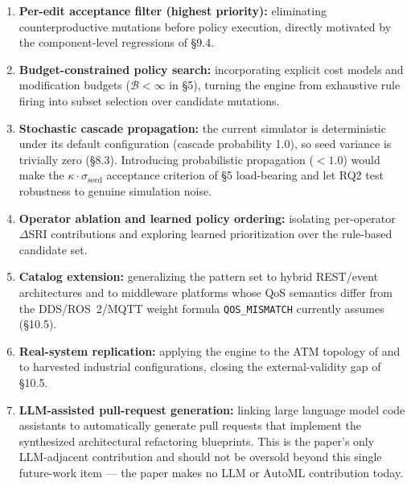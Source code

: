 \documentclass[11pt]{article}
\begin{document}
\begin{enumerate}
\item \textbf{Per-edit acceptance filter (highest priority):} eliminating counterproductive mutations
  before policy execution, directly motivated by the component-level regressions of \S9.4.
\item \textbf{Budget-constrained policy search:} incorporating explicit cost models and modification
  budgets ($\mathcal{B} < \infty$ in \S5), turning the engine from exhaustive rule firing into subset
  selection over candidate mutations.
\item \textbf{Stochastic cascade propagation:} the current simulator is deterministic under its
  default configuration (cascade probability 1.0), so seed variance is trivially zero (\S8.3).
  Introducing probabilistic propagation ($<1.0$) would make the $\kappa\cdot\sigma_{\text{seed}}$
  acceptance criterion of \S5 load-bearing and let RQ2 test robustness to genuine simulation noise.
\item \textbf{Operator ablation and learned policy ordering:} isolating per-operator $\Delta$SRI
  contributions and exploring learned prioritization over the rule-based candidate set.
\item \textbf{Catalog extension:} generalizing the pattern set to hybrid REST/event architectures and
  to middleware platforms whose QoS semantics differ from the DDS/ROS~2/MQTT weight formula
  \texttt{QOS\_MISMATCH} currently assumes (\S10.5).
\item \textbf{Real-system replication:} applying the engine to the ATM topology of \cite{SaG} and to
  harvested industrial configurations, closing the external-validity gap of \S10.5.
\item \textbf{LLM-assisted pull-request generation:} linking large language model code assistants to
  automatically generate pull requests that implement the synthesized architectural refactoring
  blueprints. This is the paper's only LLM-adjacent contribution and should not be oversold beyond
  this single future-work item --- the paper makes no LLM or AutoML contribution today.
\end{enumerate}
\end{document}
